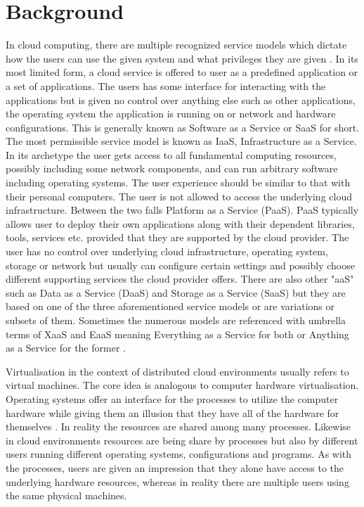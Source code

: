 \section{Background}

			In cloud computing, there are multiple recognized service models which dictate how the users can use the given system and what privileges they are given \cite{Mell:2011:SND:2206223}. In its most limited form, a cloud service is offered to user as a predefined application or a set of applications. The users has some interface for interacting with the applications but is given no control over anything else such as other applications, the operating system the application is running on or network and hardware configurations. This is generally known as Software as a Service or SaaS for short. The most permissible service model is known as IaaS, Infrastructure as a Service. In its archetype the user gets access to all fundamental computing resources, possibly including some network components, and can run arbitrary software including operating systems. The user experience should be similar to that with their personal computers. The user is not allowed to access the underlying cloud infrastructure. Between the two falls Platform as a Service (PaaS). PaaS typically allows user to deploy their own applications along with their dependent libraries, tools, services etc. provided that they are supported by the cloud provider. The user has no control over underlying cloud infrastructure, operating system, storage or network but usually can configure certain settings and possibly choose different supporting services the cloud provider offers. There are also other "aaS" such as Data as a Service (DaaS) and Storage as a Service (SaaS) but they are based on one of the three aforementioned service models or are variations or subsets of them. Sometimes the numerous models are referenced with umbrella terms of XaaS and EaaS meaning Everything as a Service for both or Anything as a Service for the former \cite{XaaS}.

Virtualisation in the context of distributed cloud environments usually refers to virtual machines. The core idea is analogous to computer hardware virtualisation. Operating systems offer an interface for the processes to utilize the computer hardware while giving them an illusion that they have all of the hardware for themselves \cite{ArpaciDusseau14-Book}. In reality the resources are shared among many processes. Likewise in cloud environments resources are being share by processes but also by different users running different operating systems, configurations and programs. As with the processes, users are given an impression that they alone have access to the underlying hardware resources, whereas in reality there are multiple users using the same physical machines.


